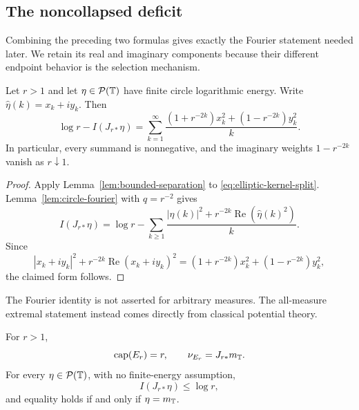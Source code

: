 \subsection{The noncollapsed deficit}

Combining the preceding two formulas gives exactly the Fourier statement
needed later.  We retain its real and imaginary components because their
different endpoint behavior is the selection mechanism.

\begin{proposition}\label{prop:elliptic-deficit}
Let \(r>1\) and let \(\eta\in\mathcal P(\mathbb{T})\) have finite circle
logarithmic energy.  Write
\(\widehat\eta(k)=x_k+iy_k\).  Then
\begin{equation}\label{eq:elliptic-deficit}
 \log r-I(J_{r\ast}\eta)
 =\sum_{k=1}^{\infty}
 \frac{(1+r^{-2k})x_k^2+(1-r^{-2k})y_k^2}{k}.
\end{equation}
In particular, every summand is nonnegative, and the imaginary weights
\(1-r^{-2k}\) vanish as \(r\downarrow1\).
\end{proposition}

\begin{proof}
Apply Lemma~\ref{lem:bounded-separation} to
\eqref{eq:elliptic-kernel-split}.  Lemma~\ref{lem:circle-fourier} with
\(q=r^{-2}\) gives
\[
 I(J_{r\ast}\eta)
 =\log r-\sum_{k\geq1}
 \frac{|\widehat\eta(k)|^2
 +r^{-2k}\operatorname{Re}(\widehat\eta(k)^2)}{k}.
\]
Since
\[
 |x_k+iy_k|^2+r^{-2k}\operatorname{Re}(x_k+iy_k)^2
 =(1+r^{-2k})x_k^2+(1-r^{-2k})y_k^2,
\]
the claimed form follows.
\end{proof}

The Fourier identity is not asserted for arbitrary measures.  The
all-measure extremal statement instead comes directly from classical
potential theory.

\begin{proposition}
\label{prop:unique-elliptic-maximizer}
For \(r>1\),
\[
 \operatorname{cap}(E_r)=r,
 \qquad
 \nu_{E_r}=J_{r\ast}m_{\mathbb{T}}.
\]
For every \(\eta\in\mathcal P(\mathbb{T})\), with no finite-energy assumption,
\begin{equation}\label{eq:all-measure-bound}
 I(J_{r\ast}\eta)\leq\log r,
\end{equation}
and equality holds if and only if \(\eta=m_{\mathbb{T}}\).
\end{proposition}

